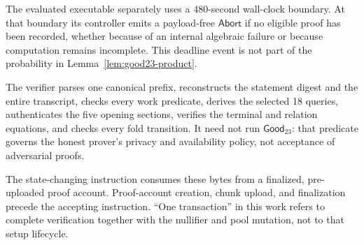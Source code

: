 The evaluated executable separately uses a 480-second wall-clock boundary.
At that boundary its controller emits a payload-free \(\mathsf{Abort}\) if no
eligible proof has been recorded, whether because of an internal algebraic
failure or because computation remains incomplete.  This deadline event is
not part of the probability in Lemma~\ref{lem:good23-product}.

The verifier parses one canonical prefix, reconstructs the statement digest
and the entire transcript, checks every work predicate, derives the selected
18 queries, authenticates the five opening sections, verifies the terminal
and relation equations, and checks every fold transition.  It need not run
\(\mathsf{Good}_{23}\): that predicate governs the honest prover's privacy
and availability policy, not acceptance of adversarial proofs.

The state-changing instruction consumes these bytes from a finalized,
pre-uploaded proof account.  Proof-account creation, chunk upload, and
finalization precede the accepting instruction.  ``One transaction'' in this
work refers to complete verification together with the nullifier and pool
mutation, not to that setup lifecycle.
